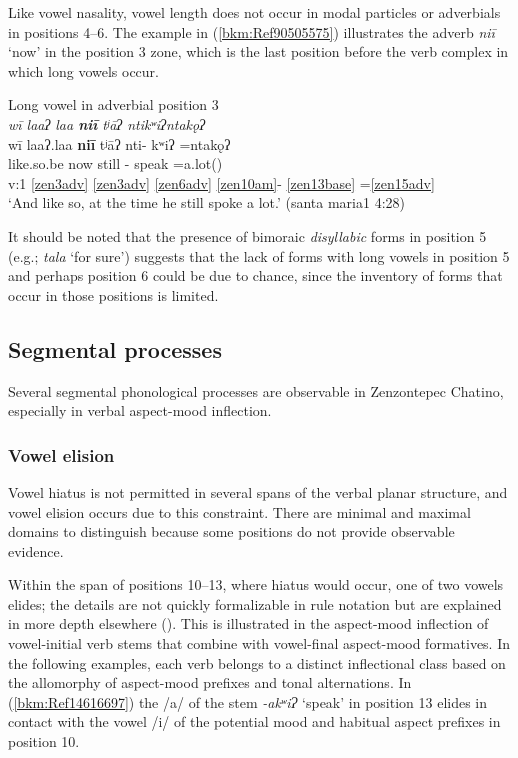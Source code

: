 \documentclass[output=paper]{langscibook}
\begin{document}
\label{bkm:Ref113308255}
Like vowel nasality, vowel length does not occur in modal particles or adverbials in positions 4{}--6. The example in (\ref{bkm:Ref90505575}) illustrates the adverb \textit{niī} `now' in the position 3 zone, which is the last position before the verb complex in which long vowels occur.


\ea\label{bkm:Ref90505575}Long vowel in adverbial position 3\\
\textit{wī laaʔ laa \textbf{niī} tʲāʔ ntikʷiʔntakǫʔ}\\
\glll wī laaʔ.laa \textbf{niī} tʲāʔ nti- kʷiʔ =ntakǫʔ \\
\Conj{} like.so.be now still \Hab{}- speak =a.lot(\Third{})\\
v:1 \ref{zen3adv} \ref{zen3adv} \ref{zen6adv} \ref{zen10am}{}- \ref{zen13base} =\ref{zen15adv}\\
\glt `And like so, at the time he still spoke a lot.' (santa maria1 4:28)
\z

It should be noted that the presence of bimoraic \textit{disyllabic} forms in position 5 (e.g.; \textit{tala} `for sure') suggests that the lack of forms with long vowels in position 5 and perhaps position 6 could be due to chance, since the inventory of forms that occur in those positions is limited.

\subsection{Segmental processes}
\label{bkm:Ref90475064}
Several segmental phonological processes are observable in Zenzontepec Chatino, especially in verbal aspect-mood inflection.

\subsubsection{Vowel elision}
\label{bkm:Ref90494223}
Vowel hiatus is not permitted in several spans of the verbal planar structure, and vowel elision occurs due to this constraint. There are minimal and maximal domains to distinguish because some positions do not provide observable evidence.

\label{bkm:Ref113308269}
Within the span of positions 10{}--13, where hiatus would occur, one of two vowels elides; the details are not quickly formalizable in rule notation but are explained in more depth elsewhere (\citealt{Campbell2011,Campbell2019}). This is illustrated in the aspect-mood inflection of vowel-initial verb stems that combine with vowel-final aspect-mood formatives. In the following examples, each verb belongs to a distinct inflectional class based on the allomorphy of aspect-mood prefixes and tonal alternations. In (\ref{bkm:Ref14616697}) the /a/ of the stem \textit{{}-akʷiɁ} `speak' in position 13 elides in contact with the vowel /i/ of the potential mood and habitual aspect prefixes in position 10.
\end{document}
